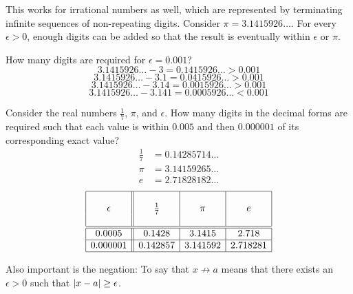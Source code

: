 \documentclass[letterpaper,12pt,fleqn]{article}
\newcommand{\e}{\epsilon}
\begin{document}
\begin{example}
  This works for irrational numbers as well, which are represented by terminating infinite sequences of
  non-repeating digits.  Consider \(\pi=3.1415926\ldots\).  For every \(\e>0\), enough digits can be added so that
  the result is eventually within \(\e\) or \(\pi\).

  \bigskip

  \begin{center}
  \end{center}

  How many digits are required for \(\e=0.001\)?
  \[3.1415926\ldots-3=0.1415926\ldots>0.001\]
  \[3.1415926\ldots-3.1=0.0415926\ldots>0.001\]
  \[3.1415926\ldots-3.14=0.0015926\ldots>0.001\]
  \[3.1415926\ldots-3.141=0.0005926\ldots<0.001\]
\end{example}

\begin{example}
  Consider the real numbers \(\frac{1}{7}\), \(\pi\), and \(\e\).  How many digits in the decimal forms are required
  such that each value is within \(0.005\) and then \(0.000001\) of its corresponding exact value?
  \begin{align*}
    \frac{1}{7} &= 0.14285714\ldots \\
    \pi &= 3.14159265\ldots \\
    e &= 2.71828182\ldots
  \end{align*}
  \[\begin{array}{|c||c|c|c|}
  \hline
  & & & \\
  \e & \frac{1}{7} & \pi & e \\
  & & & \\
  \hline
  \hline
  0.0005 & 0.1428 & 3.1415 & 2.718 \\
  \hline
  0.000001 & 0.142857 & 3.141592 & 2.718281 \\
  \hline
  \end{array}\]
\end{example}

Also important is the negation: To say that \(x\not\to a\) means that there exists an \(\e>0\) such that
\(\abs{x-a}\ge\e\).
\end{document}
